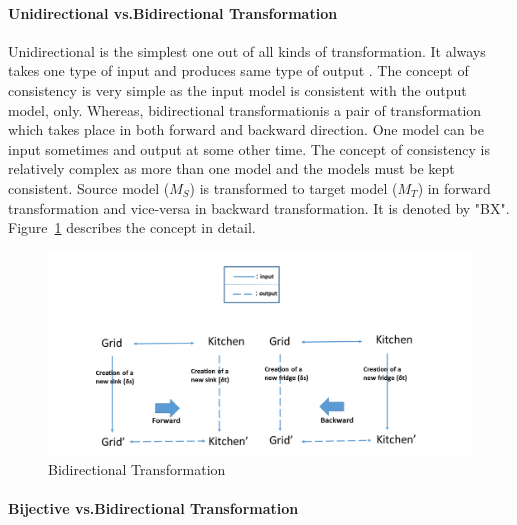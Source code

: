 \paragraph{Unidirectional vs.Bidirectional Transformation}  Unidirectional is the simplest one out of all kinds of transformation. It always takes one type of input and produces same type of output \cite{wiki-transformation}. The concept of consistency is very simple as the input model is consistent with the output model, only.
\newline Whereas, bidirectional transformationis a pair of transformation which takes place in both forward and backward direction. One model can be input sometimes and output at some other time. The concept of consistency is relatively complex as more than one model and the models must be kept consistent. Source model ($M_{S}$) is transformed to target model ($M_{T}$) in forward transformation and vice-versa in backward transformation. It is denoted by "BX". 
\newline Figure~\ref{fig:BX_Diagram} describes the concept in detail.
\begin{figure}
	\includegraphics[width=1\textwidth]{figures/BX}
	\caption{Bidirectional Transformation}
	\label{fig:BX_Diagram}
\end{figure}

\paragraph{Bijective vs.Bidirectional Transformation}  


 



